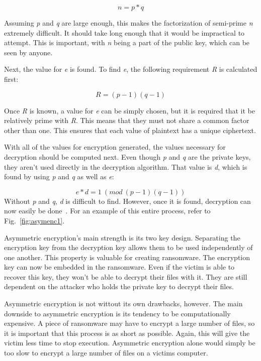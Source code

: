 \documentclass{IEEEtran}
\begin{document}
\[n = p * q \]\label{eq5}

Assuming \textit{p} and \textit{q} are large enough, this makes the factorization of semi-prime \textit{n} extremely difficult. It should take long enough that it would be impractical to attempt. This is important, with \textit{n} being a part of the public key, which can be seen by anyone.

Next, the value for \textit{e} is found. To find \textit{e}, the following requirement \textit{R} is calculated first:

\[R = (p-1)(q-1) \]\label{eq6}

Once \textit{R} is known, a value for \textit{e} can be simply chosen, but it is required that it be relatively prime with \textit{R}. This means that they must not share a common factor other than one. This ensures that each value of plaintext has a unique ciphertext.

With all of the values for encryption generated, the values necessary for decryption should be computed next. Even though \textit{p} and \textit{q} are the private keys, they aren't used directly in the decryption algorithm. That value is \textit{d}, which is found by using \textit{p} and \textit{q} as well as \textit{e}:

\[e * d =  1~(mod~(p-1)(q-1))\]
Without \textit{p} and \textit{q}, \textit{d} is difficult to find. However, once it is found, decryption can now easily be done~\cite{RN28}. For an example of this entire process, refer to Fig.~\ref{fig:asymenc1}.

Asymmetric encryption's main strength is its two key design. Separating the encryption key from the decryption key allows them to be used independently of one another. This property is valuable for creating ransomware. The encryption key can now be embedded in the ransomware. Even if the victim is able to recover this key, they won't be able to decrypt their files with it. They are still dependent on the attacker who holds the private key to decrypt their files.

Asymmetric encryption is not wittout its own drawbacks, however. The main downside to asymmetric encryption is its tendency to be computationally expensive. A piece of ransomware may have to encrypt a large number of files, so it is important that this process is as short as possible. Again, this will give the victim less time to stop execution. Asymmetric encryption alone would simply be too slow to encrypt a large number of files on a victims computer.
\end{document}
